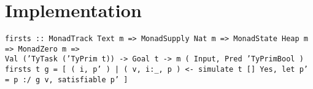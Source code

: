 
\section{Implementation}
\label{sec:implementation}
\lstset{language=Haskell}
\tiny\noindent%
\texttt{firsts :: MonadTrack Text m => MonadSupply Nat m => MonadState Heap m => MonadZero m =>}\\
\texttt{Val ('TyTask ('TyPrim t)) -> Goal t -> m ( Input, Pred 'TyPrimBool )}\\
\texttt{firsts t g = [ ( i, p' ) | ( v, i:_, p ) <- simulate t [] Yes, let p' = p :/\: g v, satisfiable p' ]}
